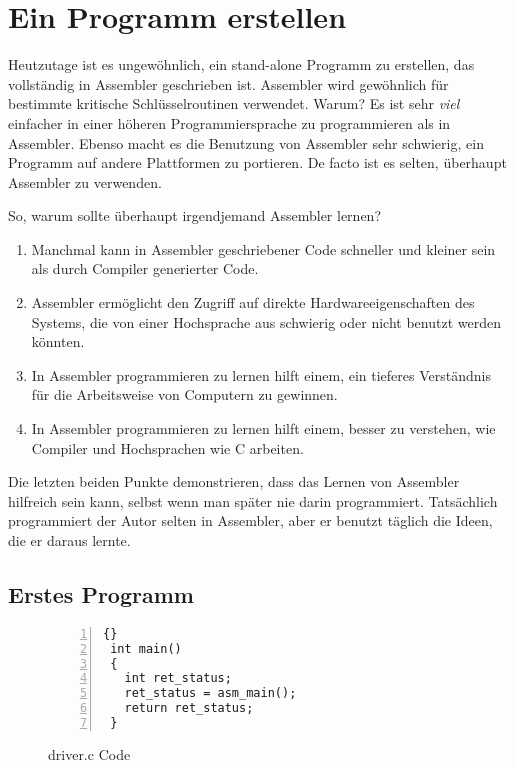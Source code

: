 \section{Ein Programm erstellen}

Heutzutage ist es ungew\"{o}hnlich, ein stand-alone Programm zu
erstellen, das vollst\"{a}ndig in Assembler geschrieben ist. Assembler
wird gew\"{o}hnlich f\"{u}r bestimmte kritische Schl\"{u}sselroutinen verwendet.
Warum? Es ist sehr \emph{viel} einfacher in einer h\"{o}heren
Programmiersprache zu programmieren als in Assembler. Ebenso macht
es die Benutzung von Assembler sehr schwierig, ein Programm auf
andere Plattformen zu portieren. De facto ist es selten, \"{u}berhaupt
Assembler zu verwenden.

So, warum sollte \"{u}berhaupt irgendjemand Assembler lernen?
\begin{enumerate}
\parskip=-0.20em %

\item
Manchmal kann in Assembler geschriebener Code schneller und kleiner
sein als durch Compiler generierter Code.

\item
Assembler erm\"{o}glicht den Zugriff auf direkte Hardwareeigenschaften
des Systems, die von einer Hochsprache aus schwierig oder nicht
benutzt werden k\"{o}nnten.

\item
In Assembler programmieren zu lernen hilft einem, ein tieferes
Verst\"{a}ndnis f\"{u}r die Arbeitsweise von Computern zu gewinnen.

\item
In Assembler programmieren zu lernen hilft einem, besser zu
verstehen, wie Compiler und Hochsprachen wie C arbeiten.
\end{enumerate}
Die letzten beiden Punkte demonstrieren, dass das Lernen von
Assembler hilfreich sein kann, selbst wenn man sp\"{a}ter nie darin
programmiert. Tats\"{a}chlich programmiert der Autor selten in
Assembler, aber er benutzt t\"{a}glich die Ideen, die er daraus lernte.

\subsection{Erstes Programm \label{sec:introEx}}

\begin{figure}[t]
\begin{lstlisting}[frame=tlrb, numbers=left]{}
 int main()
 {
   int ret_status;
   ret_status = asm_main();
   return ret_status;
 }
\end{lstlisting}
\caption{{\code driver.c} Code\label{fig:driverProg} }
\end{figure}

